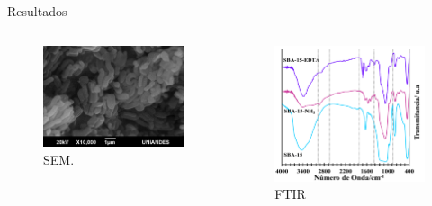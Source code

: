 \documentclass[handout]{beamer}
\begin{document}
\begin{frame}{Resultados}
	\begin{columns}
		\begin{column}{0.5\textwidth}
			\begin{figure}
				\centering
				\includegraphics[width=\linewidth]{../structures/SEM.png}
				\caption{SEM.}
			\end{figure}
		\end{column}
		\begin{column}{0.5\textwidth}
			\begin{figure}
				\centering
				\includegraphics[width=\linewidth]{../structures/IR.png}
				\caption{FTIR}
			\end{figure}
		\end{column}
	\end{columns}
\end{frame}
\end{document}
